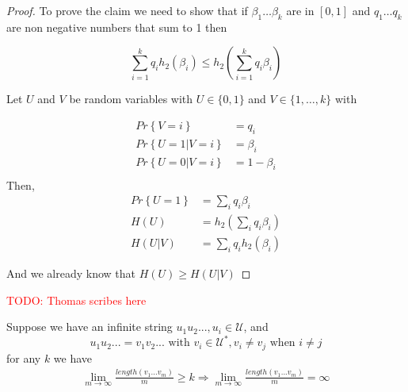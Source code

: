 \documentclass[twoside]{article}
\theoremstyle{definition} %
\newcommand{\todo}[1]{\textcolor{red}{TODO: #1}}
\renewcommand{\Pr}[1]{Pr\left\{#1\right\}}
\def\U{\mathcal{U}}
\begin{document}
\begin{proof}
  To prove the claim we need to show that if $\beta_1\dots \beta_k$ are in $[0,1]$ and $q_1 \dots q_k$ are non negative numbers that sum to 1 then

  \[
    \sum_{i=1}^k q_i h_2(\beta_i) \leq h_2 \left(\sum_{i=1}^k q_i \beta_i \right)
  \]

  Let $U$ and $V$ be random variables with $U \in \{0,1\}$ and $V \in \{1,\dots,k\}$ with

  \begin{align*}
    \Pr{V=i} &= q_i\\
    \Pr{U=1|V=i} &= \beta_i\\
    \Pr{U=0|V=i} &= 1- \beta_i\\
  \end{align*}
  Then,
  \begin{align*}
    \Pr{U=1} &= \sum_i q_i \beta_i\\
    H(U) &= h_2\left(\sum_i q_i \beta_i \right)\\
    H(U|V) &= \sum_i q_i h_2(\beta_i)
  \end{align*}

  And we already know that $H(U) \geq H(U|V)$
\end{proof}










\todo{Thomas scribes here}


Suppose we have an infinite string $u_1 u_2 ..., u_i \in \U$, and
$$u_1 u_2 ... = v_1 v_2 ... \text{ with } v_i \in \U^*, v_i \neq v_j \text{ when } i \neq j$$
for any $k$ we have
\begin{align*}
  \lim_{m \to \infty} \frac{length(v_1...v_m)}{m} \geq k
  \Rightarrow \lim_{m \to \infty} \frac{length(v_1 ... v_m)}{m} =
  \infty
\end{align*}
\end{document}
